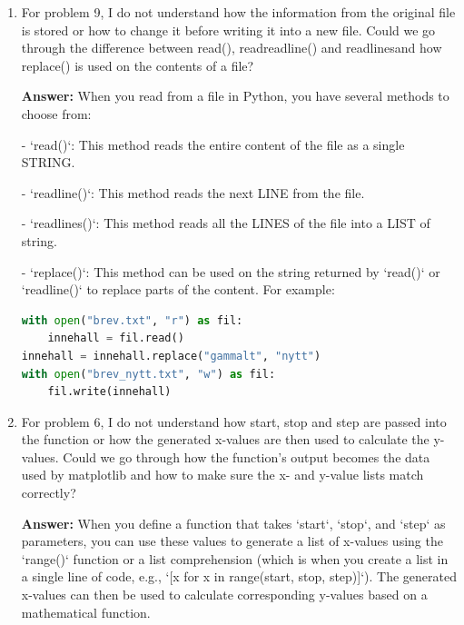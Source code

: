 \documentclass{article}
\begin{document}
\begin{enumerate}
You can also build a matrix with this method:   
\begin{lstlisting}[language=Python]
matrix = []
num = 1
for i in range(3):  # Outer loop for rows
    row = []
    for j in range(4):  # Inner loop for columns
        row.append(num) # This adds current nr: 1, 2, 3, 4
        num += 1
    matrix.append(row) # This adds row to matrix: 1, 2, 3
\end{lstlisting}

In math this would be $\sum_{i=0}^{2}\sum_{j=0}^{3} num_{ij} = 30$ to get the sum of the matrix.

\item For problem 9, I do not understand how the information from the original file is stored or how to change it before writing it into a new file. Could we go through the difference between read(), readreadline() and readlinesand how replace() is used on the contents of a file?

\textbf{Answer:} When you read from a file in Python, you have several methods to choose from:

- `read()`: This method reads the entire content of the file as a single STRING.


- `readline()`: This method reads the next LINE from the file.


- `readlines()`: This method reads all the LINES of the file into a LIST of string.


- `replace()`: This method can be used on the string returned by `read()` or `readline()` to replace parts of the content. For example:
\begin{lstlisting}[language=Python]
with open("brev.txt", "r") as fil:
    innehall = fil.read()
innehall = innehall.replace("gammalt", "nytt")
with open("brev_nytt.txt", "w") as fil:
    fil.write(innehall)
\end{lstlisting}

\item For problem 6, I do not understand how start, stop and step are passed into the function or how the generated x-values are then used to calculate the y-values. Could we go through how the function’s output becomes the data used by matplotlib and how to make sure the x- and y-value lists match correctly?

\textbf{Answer:} When you define a function that takes `start`, `stop`, and `step` as parameters, you can use these values to generate a list of x-values using the `range()` function or a list comprehension (which is when you create a list in a single line of code, e.g., `[x for x in range(start, stop, step)]`). The generated x-values can then be used to calculate corresponding y-values based on a mathematical function.


\end{enumerate}
\end{document}
